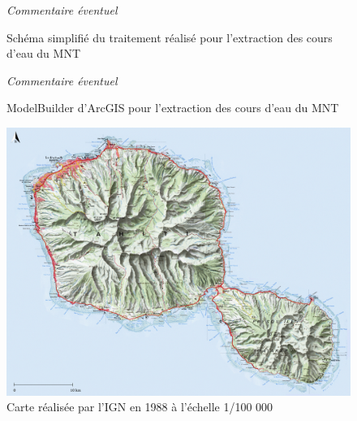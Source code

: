 \documentclass{themeensg}
\begin{document}
\begin{appendices}
\addtocounter{figure}{-1}
\begin{figure}
\addtocounter{figure}{1}
\centering
{}%
\caption{Schéma simplifié du traitement réalisé pour l'extraction des cours d'eau du MNT}%
\textit{Commentaire éventuel}
\end{figure}

\addtocounter{figure}{-1}
\begin{figure}
\addtocounter{figure}{1}
\centering
{}%
\caption{ModelBuilder d'ArcGIS pour l'extraction des cours d'eau du MNT}%
\textit{Commentaire éventuel}
\end{figure}


\clearpage

\label{annexeign88}

\begin{figure}[!h]
\centering
\includegraphics[width=\linewidth]{images/Annexes/tahiti_ign_1988.png}%
\caption{Carte réalisée par l'IGN en 1988 à l'échelle 1/100 000}%
\label{carte1988}%
\end{figure}



\end{appendices}
\end{document}
